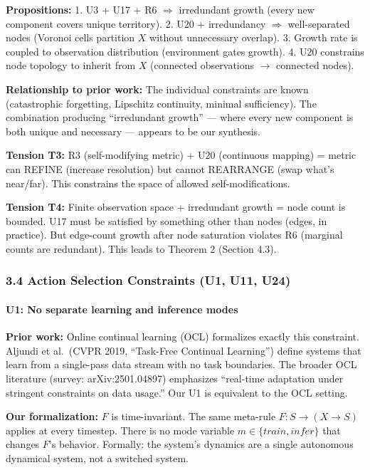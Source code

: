 \documentclass[
  11pt,
]{article}
\begin{document}
\textbf{Propositions:} 1. U3 + U17 + R6 \(\Rightarrow\) irredundant
growth (every new component covers unique territory). 2. U20 +
irredundancy \(\Rightarrow\) well-separated nodes (Voronoi cells
partition \(X\) without unnecessary overlap). 3. Growth rate is coupled
to observation distribution (environment gates growth). 4. U20
constrains node topology to inherit from \(X\) (connected observations
\(\to\) connected nodes).

\textbf{Relationship to prior work:} The individual constraints are
known (catastrophic forgetting, Lipschitz continuity, minimal
sufficiency). The combination producing ``irredundant growth'' --- where
every new component is both unique and necessary --- appears to be our
synthesis.

\textbf{Tension T3:} R3 (self-modifying metric) + U20 (continuous
mapping) = metric can REFINE (increase resolution) but cannot REARRANGE
(swap what's near/far). This constrains the space of allowed
self-modifications.

\textbf{Tension T4:} Finite observation space + irredundant growth =
node count is bounded. U17 must be satisfied by something other than
nodes (edges, in practice). But edge-count growth after node saturation
violates R6 (marginal counts are redundant). This leads to Theorem 2
(Section 4.3).

\subsubsection{3.4 Action Selection Constraints (U1, U11,
U24)}\label{action-selection-constraints-u1-u11-u24}

\paragraph{U1: No separate learning and inference
modes}\label{u1-no-separate-learning-and-inference-modes}

\textbf{Prior work:} Online continual learning (OCL) formalizes exactly
this constraint. Aljundi et al.~(CVPR 2019, ``Task-Free Continual
Learning'') define systems that learn from a single-pass data stream
with no task boundaries. The broader OCL literature (survey:
arXiv:2501.04897) emphasizes ``real-time adaptation under stringent
constraints on data usage.'' Our U1 is equivalent to the OCL setting.

\textbf{Our formalization:} \(F\) is time-invariant. The same meta-rule
\(F: S \to (X \to S)\) applies at every timestep. There is no mode
variable \(m \in \{train, infer\}\) that changes \(F\)'s behavior.
Formally: the system's dynamics are a single autonomous dynamical
system, not a switched system.
\end{document}
